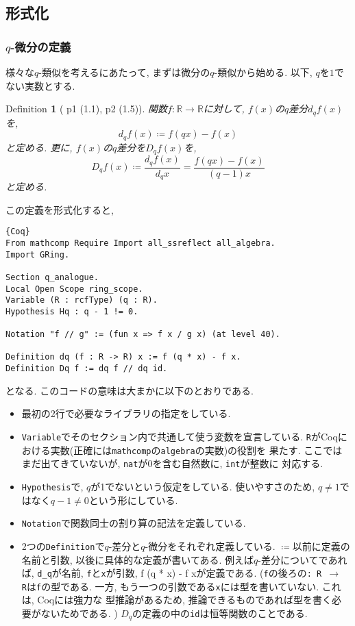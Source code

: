 \documentclass[11pt]{jarticle}
\theoremstyle{mystyle}
\newtheorem{df}{$\textrm{Definition}$}[subsubsection]
\newcommand{\bdf}{\begin{shadebox} \begin{df}}
\newcommand{\edf}{\end{df} \end{shadebox}}
\newcommand{\R}{\mathbb{R}}
\newcommand{\0}{\textbf{0}}
\newcommand{\1}{\textbf{1}}
\newcommand{\2}{\textbf{2}}
\begin{document}
\subsection{形式化}
\subsubsection{$q$-微分の定義}
様々な$q$-類似を考えるにあたって, まずは微分の$q$-類似から始める. 以下, $q$を$1$でない実数とする. 
\bdf[\cite{Kac} p1 (1.1), p2 (1.5)]
  関数$f : \R \to \R$に対して, $f(x)$の$q$差分$d_q f(x)$を, 
  \[
    d_q f(x) \coloneqq f (qx) - f(x)
  \]
  と定める. 更に, $f(x)$の$q$差分を$D_q f(x)$を, 
  \[
    D_q f(x) \coloneqq \frac{d_q f(x)}{d_q x} = \frac{f(qx) - f(x)}{(q - 1) x}
  \]
  と定める. 
\edf
この定義を形式化すると, 
\begin{lstlisting}{Coq}
From mathcomp Require Import all_ssreflect all_algebra.
Import GRing.

Section q_analogue.
Local Open Scope ring_scope.
Variable (R : rcfType) (q : R).
Hypothesis Hq : q - 1 != 0.

Notation "f // g" := (fun x => f x / g x) (at level 40).

Definition dq (f : R -> R) x := f (q * x) - f x.
Definition Dq f := dq f // dq id. 
\end{lstlisting}
となる. このコードの意味は大まかに以下のとおりである. 
\begin{itemize}
  \item 最初の2行で必要なライブラリの指定をしている. 
  \item {\tt Variable}でそのセクション内で共通して使う変数を宣言している. 
          {\tt R}がCoqにおける実数(正確には{\tt mathcomp}の{\tt algebra}の実数)の役割を
          果たす. ここではまだ出てきていないが, {\tt nat}が$0$を含む自然数に, {\tt int}が整数に
          対応する. 
  \item {\tt Hypothesis}で, $q$が1でないという仮定をしている. 使いやすさのため, 
          $q \ne 1$ではなく$q - 1 \ne 0$という形にしている. 
  \item {\tt Notation}で関数同士の割り算の記法を定義している. 
  \item 2つの{\tt Definition}で$q$-差分と$q$-微分をそれぞれ定義している. 
          {\tt $\coloneqq$}以前に定義の名前と引数, 以後に具体的な定義が書いてある. 
          例えば$q$-差分についてであれば, {\tt d\_q}が名前, {\tt f}と{\tt x}が引数, 
          {f (q * x) - f x}が定義である. ({\tt f}の後ろの{\tt : R $\to$ R}は{\tt f}の型である. 
          一方, もう一つの引数である{\tt x}には型を書いていない. これは, Coqには強力な
          型推論があるため, 推論できるものであれば型を書く必要がないためである. )
          $D_q$の定義の中の{\tt id}は恒等関数のことである. 
\end{itemize}
\end{document}
